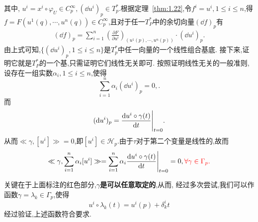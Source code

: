 \begin{fancybox}
\begin{center}
\end{center}
其中, $u^i=x^i\circ \varphi_U\in C_p^\infty,(\dd u^i)_p\in T_p^*$.根据定理~\ref{thm:1.22},令$f^i=u^i,1\leqslant i\leqslant n$,得$ f=F(u^1(q),\cdots,u^n(q))\in C_p^\infty$,且对于任一$T_P^*$中的余切向量$(\dd f)_p$有
\begin{align*}
(\dd f)_p=\sum_{i=1}^{n}\left(\frac{\partial F}{\partial u^i}\right)_{(u^1(p),\cdots,u^n(p))}\cdot (\dd u^i)_p.
\end{align*}
由上式可知,$\{(\dd u^i)_p,1\leqslant i\leqslant n\}$是$T_p^*$中任一向量的一个线性组合基底.
接下来,证明它就是$T_P^*$的一个基,只需证明它们线性无关即可.
按照证明线性无关的一般准则,设存在一组实数$\alpha_i,1\leqslant i\leqslant n$,使得
\begin{equation*}
\sum_{i=1}^{n}\alpha_i (\dd u^i)_p=0,.
\end{equation*}
而
\begin{align*}
(\dd u^i)_p=\frac{\dd u^i\circ \gamma(t)}{\dd t}\Bigg|_{t=0}.
\end{align*}
从而$\ll\gamma,[u^i]\gg=0$,即$[u^i]\in\mathscr{H}_p$.由于$\tau$对于第二个变量是线性的,故而
\[\ll \gamma,\sum_{i=1}^{n}\alpha_i [u^i]\gg=\sum_{i=1}^{n}\alpha_i \frac{\dd u^i\circ\gamma(t)}{\dd t}\Bigg|_{t=0}=0,\color{red}{\forall \gamma\in\Gamma_p}.\]

关键在于上面标注的红色部分,\textbf{$\gamma$是可以任意取定的},从而, 经过多次尝试,我们可以作函数$\gamma=\lambda_k\in \Gamma_p$,使得
\begin{equation*}
u^i\circ\lambda_k(t)=u^i(p)+\delta_k^i t
\end{equation*}
经过验证,上述函数符合要求.
\end{fancybox}



